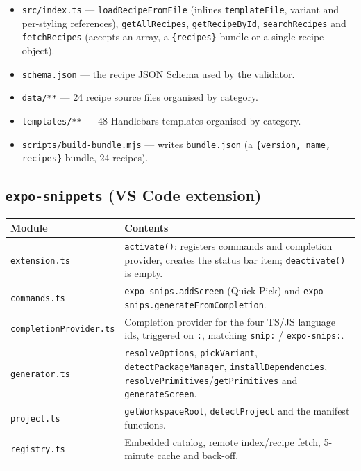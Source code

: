 \begin{itemize}
  \item \texttt{src/index.ts} --- \texttt{loadRecipeFromFile} (inlines
        \texttt{templateFile}, variant and per-styling references),
        \texttt{getAllRecipes}, \texttt{getRecipeById}, \texttt{searchRecipes} and
        \texttt{fetchRecipes} (accepts an array, a \texttt{\{recipes\}} bundle or a
        single recipe object).
  \item \texttt{schema.json} --- the recipe JSON Schema used by the validator.
  \item \texttt{data/**} --- 24 recipe source files organised by category.
  \item \texttt{templates/**} --- 48 Handlebars templates organised by category.
  \item \texttt{scripts/build-bundle.mjs} --- writes \texttt{bundle.json} (a
        \texttt{\{version, name, recipes\}} bundle, 24 recipes).
\end{itemize}

\subsection*{\texttt{expo-snippets} (VS Code extension)}

\begin{longtable}{@{}L{4.2cm}L{9.8cm}@{}}
\toprule
\textbf{Module} & \textbf{Contents} \\
\midrule
\endhead
\texttt{extension.ts} & \texttt{activate()}: registers commands and completion
provider, creates the status bar item; \texttt{deactivate()} is empty. \\
\texttt{commands.ts} & \texttt{expo-snips.addScreen} (Quick Pick) and
\texttt{expo-snips.generateFromCompletion}. \\
\texttt{completionProvider.ts} & Completion provider for the four TS/JS language
ids, triggered on \texttt{:}, matching \texttt{snip:} / \texttt{expo-snips:}. \\
\texttt{generator.ts} & \texttt{resolveOptions}, \texttt{pickVariant},
\texttt{detectPackageManager}, \texttt{installDependencies},
\texttt{resolvePrimitives}/\texttt{getPrimitives} and \texttt{generateScreen}. \\
\texttt{project.ts} & \texttt{getWorkspaceRoot}, \texttt{detectProject} and the
manifest functions. \\
\texttt{registry.ts} & Embedded catalog, remote index/recipe fetch, 5-minute cache
and back-off. \\
\bottomrule
\end{longtable}


